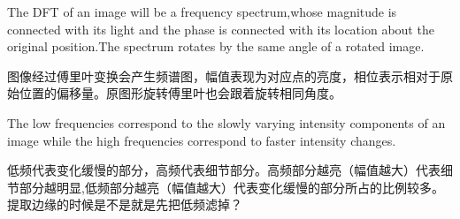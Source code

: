 \documentclass[12pt]{article}
\numberwithin{equation}{section}%
\begin{document}
The DFT of an image will be a frequency spectrum,whose magnitude is connected with its light and the phase is connected with its location about the original position.The spectrum rotates by the same angle of a rotated image. 

图像经过傅里叶变换会产生频谱图，幅值表现为对应点的亮度，相位表示相对于原始位置的偏移量。原图形旋转傅里叶也会跟着旋转相同角度。

The low frequencies correspond to the slowly varying intensity components of an image while the high frequencies correspond to faster intensity changes. 

低频代表变化缓慢的部分，高频代表细节部分。高频部分越亮（幅值越大）代表细节部分越明显,低频部分越亮（幅值越大）代表变化缓慢的部分所占的比例较多。提取边缘的时候是不是就是先把低频滤掉？


 





\end{document}

